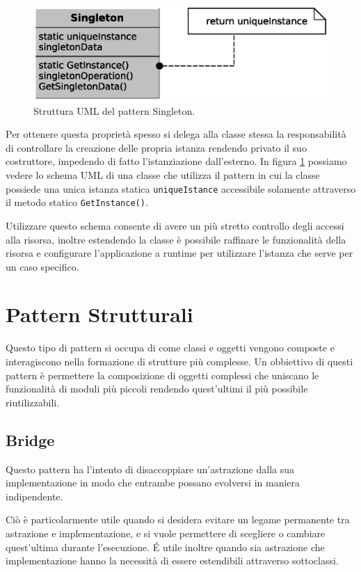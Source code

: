 \begin{figure}
\begin{center}
\includegraphics[width=12cm]{Immagini/SingletonPattern}
\caption{Struttura UML del pattern Singleton.\label{f:singletonpattern}}
\end{center} 
\end{figure}

Per ottenere questa proprietà spesso si delega alla classe stessa la responsabilità di controllare la creazione delle propria istanza rendendo privato il suo costruttore, impedendo di fatto l'istanziazione dall'esterno. In figura \ref{f:singletonpattern} possiamo vedere lo schema \ac{UML} di una classe che utilizza il pattern in cui la classe possiede una unica istanza statica \texttt{uniqueIstance} accessibile solamente attraverso il metodo statico \texttt{GetInstance()}. 

Utilizzare questo schema consente di avere un più stretto controllo degli accessi alla risorsa, inoltre estendendo la classe è possibile raffinare le funzionalità della risorsa e configurare l'applicazione a runtime per utilizzare l'istanza che serve per un caso specifico.

\section{Pattern Strutturali}
Questo tipo di pattern si occupa di come classi e oggetti vengono composte e interagiscono nella formazione di strutture più complesse. 
Un obbiettivo di questi pattern è permettere la composizione di oggetti complessi che uniscano le funzionalità di moduli più piccoli rendendo quest'ultimi il più possibile riutilizzabili.

\subsection{Bridge}
\label{sub:bridge}
Questo pattern ha l'intento di disaccoppiare un'astrazione dalla sua implementazione in modo che entrambe possano evolversi in maniera indipendente.

Ciò è particolarmente utile quando si desidera evitare un legame permanente tra astrazione e implementazione, e si vuole permettere di scegliere o cambiare quest'ultima durante l'esecuzione. É utile inoltre quando sia astrazione che implementazione hanno la necessità di essere estendibili attraverso sottoclassi. 

